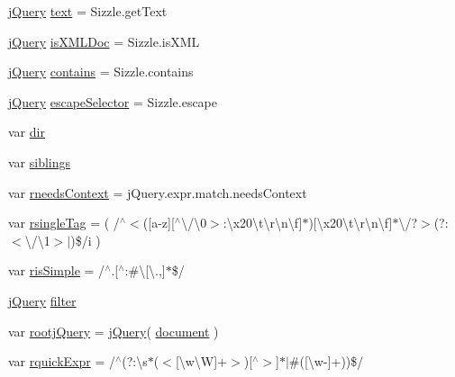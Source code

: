 \begin{DoxyCompactItemize}
\hyperlink{jquery-3_82_81_8js_a609525712f1102566c2b03866ceb2bba}{j\+Query} \hyperlink{jquery-3_82_81_8js_a95b91e2a7e965b381c9e803999f9d290}{text} = Sizzle.\+get\+Text
\item 
\hyperlink{jquery-3_82_81_8js_a609525712f1102566c2b03866ceb2bba}{j\+Query} \hyperlink{jquery-3_82_81_8js_acf4730466ce2c301378ee112fdba9139}{is\+X\+M\+L\+Doc} = Sizzle.\+is\+X\+ML
\item 
\hyperlink{jquery-3_82_81_8js_a609525712f1102566c2b03866ceb2bba}{j\+Query} \hyperlink{jquery-3_82_81_8js_ac28d955147e97e41b2a7cd70f91ab219}{contains} = Sizzle.\+contains
\item 
\hyperlink{jquery-3_82_81_8js_a609525712f1102566c2b03866ceb2bba}{j\+Query} \hyperlink{jquery-3_82_81_8js_a011c656b1466dd95d1eacbde81097da5}{escape\+Selector} = Sizzle.\+escape
\item 
var \hyperlink{jquery-3_82_81_8js_a2a297348e1717ffd9ad78297181e31b0}{dir}
\item 
var \hyperlink{jquery-3_82_81_8js_aed1722084bdf05669183b96b509f4393}{siblings}
\item 
var \hyperlink{jquery-3_82_81_8js_af9a9b2b5a8e2204f0db6de97ef25f5af}{rneeds\+Context} = j\+Query.\+expr.\+match.\+needs\+Context
\item 
var \hyperlink{jquery-3_82_81_8js_aeb1fccd21efbe0d74148e2caa83de9bf}{rsingle\+Tag} = ( /$^\wedge$$<$(\mbox{[}a-\/z\mbox{]}\mbox{[}$^\wedge$\textbackslash{}/\textbackslash{}0$>$\+:\textbackslash{}x20\textbackslash{}t\textbackslash{}r\textbackslash{}n\textbackslash{}f\mbox{]}$\ast$)\mbox{[}\textbackslash{}x20\textbackslash{}t\textbackslash{}r\textbackslash{}n\textbackslash{}f\mbox{]}$\ast$\textbackslash{}/?$>$(?\+:$<$\textbackslash{}/\textbackslash{}1$>$$\vert$)\$/i )
\item 
var \hyperlink{jquery-3_82_81_8js_a6d35492bf1db061151e235edacf4921d}{ris\+Simple} = /$^\wedge$.\mbox{[}$^\wedge$\+:\#\textbackslash{}\mbox{[}\textbackslash{}.,\mbox{]}$\ast$\$/
\item 
\hyperlink{jquery-3_82_81_8js_a609525712f1102566c2b03866ceb2bba}{j\+Query} \hyperlink{jquery-3_82_81_8js_a416d078c0ae6e311bcc3867bd87ed2e4}{filter}
\item 
var \hyperlink{jquery-3_82_81_8js_a8101d493767b94ebb7b6d5650b0809bf}{rootj\+Query} = \hyperlink{jquery-3_82_81_8js_a609525712f1102566c2b03866ceb2bba}{j\+Query}( \hyperlink{jquery-3_82_81_8js_af61dbe660d8213297c7fed5b5c99d223}{document} )
\item 
var \hyperlink{jquery-3_82_81_8js_adb9a8b088e9580cb8ce6d9d4d08305ae}{rquick\+Expr} = /$^\wedge$(?\+:\textbackslash{}s$\ast$($<$\mbox{[}\textbackslash{}w\textbackslash{}W\mbox{]}+$>$)\mbox{[}$^\wedge$$>$\mbox{]}$\ast$$\vert$\#(\mbox{[}\textbackslash{}w-\/\mbox{]}+))\$/

\end{DoxyCompactItemize}
